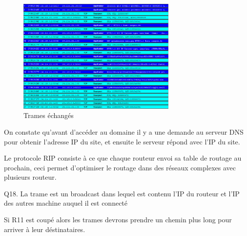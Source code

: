 \documentclass[11pt]{book}
\begin{document}
	\begin{figure}[ht!]
		\centering
		\includegraphics[width=0.7\textwidth]{./object/t2.png}
		\caption{Trames échangés}
	\end{figure}

	On constate qu'avant d'accéder au domaine il y a une demande au serveur DNS pour obtenir l'adresse IP du site, et ensuite le serveur répond avec l'IP du site. 

	Le protocole RIP consiste à ce que chaque routeur envoi sa table de routage au prochain, ceci permet d'optimiser le routage dans des réseaux complexes avec plusieurs routeur.

	Q18. La trame est un broadcast dans lequel est contenu l'IP du routeur et l'IP des autres machine auquel il est connecté 

	Si R11 est coupé alors les trames devrons prendre un chemin plus long pour arriver à leur déstinataires. 
\end{document}
